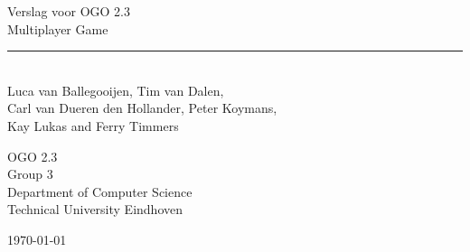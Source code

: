 \begin{titlepage}
	\begin{center}
		
		{\Huge Verslag voor OGO 2.3\\ Multiplayer Game}\\[0.5cm]
		\rule{\linewidth}{0.5mm}\\[0.5cm]
		
		
		{\Large
		Luca van Ballegooijen, Tim van Dalen, \\
		Carl van Dueren den Hollander, Peter Koymans,\\
		Kay Lukas and Ferry Timmers\\[1cm]
		}
		
		{\large
		OGO 2.3\\
		Group 3 \\[1cm]
		Department of Computer Science\\
		Technical University Eindhoven\\[1cm]
		}
		
		

		\vfill

		{\large \today}
	\end{center}
\end{titlepage}
